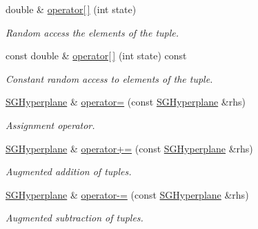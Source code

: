 \begin{DoxyCompactItemize}
double \& \hyperlink{classSGHyperplane_a4a074f4db5c1b9440adfc6a26ef849ec}{operator\mbox{[}$\,$\mbox{]}} (int state)
\begin{DoxyCompactList}\small\item\em Random access the elements of the tuple. \end{DoxyCompactList}\item 
\mbox{\label{classSGHyperplane_a12547087ec56fa4148d6057ab9bf04b2}} 
const double \& \hyperlink{classSGHyperplane_a12547087ec56fa4148d6057ab9bf04b2}{operator\mbox{[}$\,$\mbox{]}} (int state) const
\begin{DoxyCompactList}\small\item\em Constant random access to elements of the tuple. \end{DoxyCompactList}\item 
\mbox{\label{classSGHyperplane_ab4450942532a7322912aac2f4369f6f2}} 
\hyperlink{classSGHyperplane}{S\+G\+Hyperplane} \& \hyperlink{classSGHyperplane_ab4450942532a7322912aac2f4369f6f2}{operator=} (const \hyperlink{classSGHyperplane}{S\+G\+Hyperplane} \&rhs)
\begin{DoxyCompactList}\small\item\em Assignment operator. \end{DoxyCompactList}\item 
\mbox{\label{classSGHyperplane_af3570931974fe91ac522711273ac8c77}} 
\hyperlink{classSGHyperplane}{S\+G\+Hyperplane} \& \hyperlink{classSGHyperplane_af3570931974fe91ac522711273ac8c77}{operator+=} (const \hyperlink{classSGHyperplane}{S\+G\+Hyperplane} \&rhs)
\begin{DoxyCompactList}\small\item\em Augmented addition of tuples. \end{DoxyCompactList}\item 
\mbox{\label{classSGHyperplane_a533fe06af60ebb131b188706aa8b7dcc}} 
\hyperlink{classSGHyperplane}{S\+G\+Hyperplane} \& \hyperlink{classSGHyperplane_a533fe06af60ebb131b188706aa8b7dcc}{operator-\/=} (const \hyperlink{classSGHyperplane}{S\+G\+Hyperplane} \&rhs)
\begin{DoxyCompactList}\small\item\em Augmented subtraction of tuples. \end{DoxyCompactList}\item 

\end{DoxyCompactItemize}
